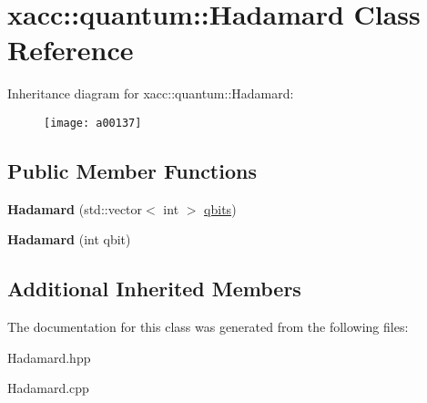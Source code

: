 \hypertarget{a00137}{}\section{xacc\+:\+:quantum\+:\+:Hadamard Class Reference}
\label{a00137}
Inheritance diagram for xacc\+:\+:quantum\+:\+:Hadamard\+:\begin{figure}[H]
\begin{center}
\leavevmode
\texttt{[image: a00137]}
\end{center}
\end{figure}
\subsection*{Public Member Functions}
\begin{DoxyCompactItemize}
\item 
{\bfseries Hadamard} (std\+::vector$<$ int $>$ \hyperlink{a00112_a2a56be6c2519ea65df4d06f4abae1393}{qbits})\hypertarget{a00137_a1f26925eeb4a52ca7e52dd9158fe7005}{}\label{a00137_a1f26925eeb4a52ca7e52dd9158fe7005}

\item 
{\bfseries Hadamard} (int qbit)\hypertarget{a00137_aac4e06aae35583bcce39b6b178948364}{}\label{a00137_aac4e06aae35583bcce39b6b178948364}

\end{DoxyCompactItemize}
\subsection*{Additional Inherited Members}


The documentation for this class was generated from the following files\+:\begin{DoxyCompactItemize}
\item 
Hadamard.\+hpp\item 
Hadamard.\+cpp\end{DoxyCompactItemize}
